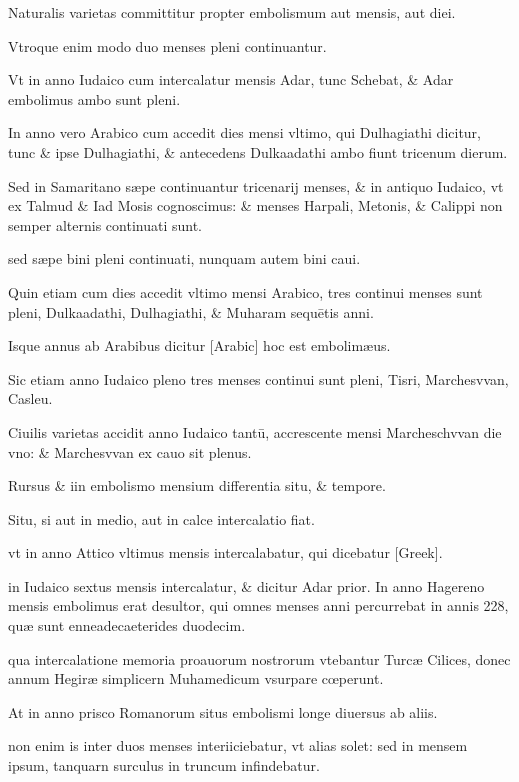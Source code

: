 \begin{parnumbers}

Naturalis varietas committitur propter embolismum
aut mensis, aut diei.

Vtroque enim modo duo menses pleni continuantur.

Vt in anno Iudaico cum intercalatur mensis Adar, tunc
Schebat, \& Adar embolimus ambo sunt pleni.

In anno vero Arabico cum accedit dies mensi vltimo, qui Dulhagiathi dicitur, tunc \& ipse Dulhagiathi, \& antecedens Dulkaadathi ambo fiunt tricenum dierum.

Sed in Samaritano sæpe continuantur tricenarij menses, \& in antiquo Iudaico, vt ex Talmud \& Iad Mosis cognoscimus: \& menses Harpali, Metonis, \& Calippi non semper alternis continuati sunt.

sed sæpe bini pleni continuati, nunquam autem bini caui.

Quin etiam cum dies accedit vltimo mensi Arabico, tres continui menses sunt pleni, Dulkaadathi, Dulhagiathi, \& Muharam sequētis anni.

Isque annus ab Arabibus dicitur \textarabic{[Arabic]} hoc est embolimæus.

Sic etiam anno Iudaico pleno tres menses continui sunt pleni, Tisri, Marchesvvan, Casleu.

Ciuilis varietas accidit anno Iudaico tantū, accrescente mensi Marcheschvvan die vno: \& Marchesvvan ex cauo sit plenus.

Rursus \& iin embolismo mensium differentia situ, \& tempore.

Situ, si aut in medio, aut in calce intercalatio fiat.

vt in anno Attico vltimus mensis intercalabatur, qui dicebatur \textgreek{[Greek]}.

in Iudaico sextus mensis intercalatur, \& dicitur Adar prior. In anno Hagereno mensis embolimus erat desultor, qui omnes menses anni percurrebat in annis 228, quæ sunt enneadecaeterides duodecim.

qua intercalatione memoria proauorum nostrorum vtebantur Turcæ Cilices, donec annum Hegiræ simplicern  Muhamedicum vsurpare cœperunt.

At in anno prisco Romanorum situs embolismi longe diuersus ab aliis.

non enim is inter duos menses interiiciebatur, vt alias solet: sed in mensem ipsum, tanquarn surculus in truncum infindebatur.


\end{parnumbers}
